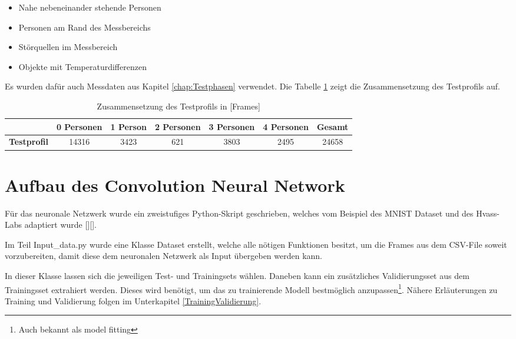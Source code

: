 \begin{itemize}
	\item Nahe nebeneinander stehende Personen 
	\item Personen am Rand des Messbereichs
	\item Störquellen im Messbereich
	\item Objekte mit Temperaturdifferenzen
\end{itemize}

Es wurden dafür auch Messdaten aus Kapitel \ref{chap:Testphasen} verwendet. Die Tabelle \ref{tab:Testprofil} zeigt die Zusammensetzung des Testprofils auf.

\begin{table}[H]
	\centering
	\caption[Zusammensetzung  des Testprofils in {[Frames]}]{Zusammensetzung  des Testprofils in [Frames]}
	\label{tab:Testprofil}
	\begin{tabular}{|c|c|c|c|c|c|c|}
		\hline
		\rowcolor[HTML]{9B9B9B} 
		\multicolumn{1}{|l|}{\cellcolor[HTML]{9B9B9B}}                   & \multicolumn{1}{l|}{\cellcolor[HTML]{9B9B9B}\textbf{0 Personen}} & \textbf{1 Person} & \textbf{2 Personen} & \textbf{3 Personen} & \textbf{4 Personen} & \textbf{Gesamt} \\ \hline
		\cellcolor[HTML]{9B9B9B}\textbf{Testprofil}                         & 14316                                                          & 3423             & 621               & 3803                & 2495               & 24658          \\ \hline
	\end{tabular}
\end{table}

\section{Aufbau des Convolution Neural Network}
\label{AufbauConv}

Für das neuronale Netzwerk wurde ein zweistufiges Python-Skript geschrieben, welches vom Beispiel des \ac{MNIST Dataset} und des Hvass-Labs adaptiert wurde [\protect\cite{Tensorflow}][\protect\cite{HVASS}].

Im Teil Input\_data.py wurde eine Klasse Dataset erstellt, welche alle nötigen Funktionen besitzt, um die Frames aus dem \ac{CSV}-File soweit vorzubereiten, damit diese dem neuronalen Netzwerk als Input übergeben werden kann. 

In dieser Klasse lassen sich die jeweiligen Test- und Trainingsets wählen. Daneben kann ein zusätzliches Validierungsset aus dem Trainingsset extrahiert werden. Dieses wird benötigt, um das zu trainierende Modell bestmöglich anzupassen\footnote[26]{Auch bekannt als model fitting}. Nähere Erläuterungen zu Training und Validierung folgen im Unterkapitel \ref{TrainingValidierung}.

